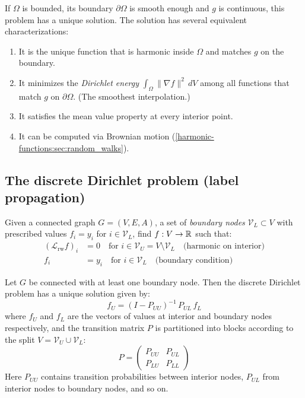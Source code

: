 \begin{notechapter}
If $\Omega$ is bounded, its boundary $\partial\Omega$ is smooth enough and $g$ is
continuous, this problem has a unique solution. The solution has several
equivalent characterizations:
\begin{enumerate}
    \item It is the unique function that is harmonic inside $\Omega$ and
          matches $g$ on the boundary.
    \item It minimizes the \emph{Dirichlet energy}
          $\int_\Omega \|\nabla f\|^2\,dV$ among all functions that match
          $g$ on $\partial\Omega$. (The smoothest interpolation.)
    \item It satisfies the mean value property at every interior point.
    \item It can be computed via Brownian motion
          (\cref{harmonic-functions:sec:random_walks}).
\end{enumerate}

\subsection{The discrete Dirichlet problem (label propagation)}

\begin{definition}
\label{harmonic-functions:def:graph_dirichlet}
Given a connected graph $G = (V, E, A)$, a set of \emph{boundary nodes}
$\mathcal{V}_L \subset V$ with prescribed values $f_i = y_i$ for
$i \in \mathcal{V}_L$, find $f : V \to \mathbb{R}$ such that:
\begin{align}
(\mathcal{L}_{\mathrm{rw}} f)_i &= 0 \quad \text{for }
  i \in \mathcal{V}_U = V \setminus \mathcal{V}_L
  \quad\text{(harmonic on interior)} \\
f_i &= y_i \quad \text{for } i \in \mathcal{V}_L
  \quad\text{(boundary condition)}
\end{align}
\end{definition}

\begin{theorem}
\label{harmonic-functions:thm:discrete_dirichlet}
Let $G$ be connected with at least one boundary node. Then the discrete
Dirichlet problem has a unique solution given by:
\begin{equation}
f_U = (I - P_{UU})^{-1}\,P_{UL}\,f_L
\end{equation}
where $f_U$ and $f_L$ are the vectors of values at interior and boundary
nodes respectively, and the transition matrix $P$ is partitioned into blocks
according to the split $V = \mathcal{V}_U \cup \mathcal{V}_L$:
\begin{equation}
P = \begin{pmatrix} P_{UU} & P_{UL} \\ P_{LU} & P_{LL} \end{pmatrix}
\end{equation}
Here $P_{UU}$ contains transition probabilities between interior nodes,
$P_{UL}$ from interior nodes to boundary nodes, and so on.
\end{theorem}


\end{notechapter}
